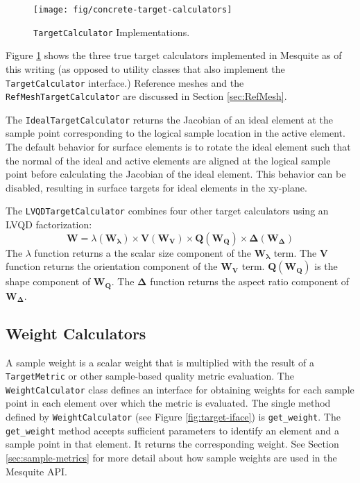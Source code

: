 \documentclass{article}
\begin{document}
\begin{figure}[htb]
\begin{center}
\texttt{[image: fig/concrete-target-calculators]}
\caption{\texttt{TargetCalculator} Implementations.\label{fig:target-concrete}}
\end{center}
\end{figure}

Figure \ref{fig:target-concrete} shows the three true target calculators implemented in Mesquite as of this writing (as opposed to utility classes that also implement the \texttt{TargetCalculator} interface.)  Reference meshes and the \texttt{RefMeshTargetCalculator} are discussed in Section \ref{sec:RefMesh}.

The \texttt{IdealTargetCalculator} returns the Jacobian of an ideal element at the sample point corresponding to the logical sample location in the active element.  The default behavior for surface elements is to rotate the ideal element such that the normal of the ideal and active elements are aligned at the logical sample point before calculating the Jacobian of the ideal element.  This behavior can be disabled, resulting in surface targets for ideal elements in the xy-plane.

The \texttt{LVQDTargetCalculator} combines four other target calculators using an LVQD factorization:
\begin{displaymath}
\mathbf{W} = \lambda(\mathbf{W_\lambda}) \times \mathbf{V}(\mathbf{W_V}) \times \mathbf{Q}(\mathbf{W_Q}) \times \mathbf{\Delta}(\mathbf{W_\Delta})
\end{displaymath}
The $\lambda$ function returns a the scalar size component of the $\mathbf{W_\lambda}$ term.  The $\mathbf{V}$ function returns the orientation component of the $\mathbf{W_V}$ term.  $\mathbf{Q}(\mathbf{W_Q})$ is the shape component of $\mathbf{W_Q}$.  The $\mathbf{\Delta}$ function returns the aspect ratio component of $\mathbf{W_\Delta}$.

\subsection{Weight Calculators}

A sample weight is a scalar weight that is multiplied with the result of a \texttt{TargetMetric} or other sample-based quality metric evaluation.  The \texttt{WeightCalculator} class defines an interface for obtaining weights for each sample point in each element over which the metric is evaluated.  The single method defined by \texttt{WeightCalculator} (see Figure \ref{fig:target-iface}) is \texttt{get\_weight}.  The \texttt{get\_weight} method accepts sufficient parameters to identify an element and a sample point in that element.  It returns the corresponding weight.  See Section \ref{sec:sample-metrics} for more detail about how sample weights are used in the Mesquite API.
\end{document}
